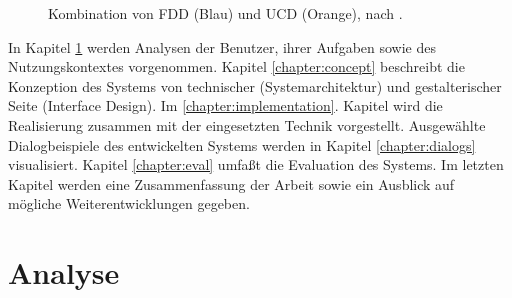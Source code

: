 \documentclass[12pt,        %
  english,ngerman,          %
  paper=a4,                 %
  captions=tablesignature,  %
  listof=numbered,          %
  bibliography=totoc,       %
  headings=small,           %
  headinclude=false,        %
  footinclude=false,        %
  parskip=half-,            %
  oneside,                  %
  BCOR=5mm,                 %
  DIV=12                    %
  ]{scrbook}                %
\begin{document}
\begin{figure}[htbp]
\begin{center}
\end{center}
\caption[Kombination von FDD und UCD, nach \protect\cite{roenspiess-2009-teaco}.]%
  {Kombination von FDD (Blau) und UCD (Orange), nach \protect\cite{roenspiess-2009-teaco}.}
\label{fig:fdducd}
\end{figure}


In Kapitel \ref{chapter:analysis} werden Analysen der Benutzer, ihrer Aufgaben sowie des Nutzungskontextes vorgenommen. Kapitel \ref{chapter:concept} beschreibt die Konzeption des Systems von technischer (Systemarchitektur) und gestalterischer Seite (Interface Design). Im \ref{chapter:implementation}. Kapitel wird die Realisierung zusammen mit der eingesetzten Technik vorgestellt. Ausgewählte Dialogbeispiele des entwickelten Systems werden in Kapitel \ref{chapter:dialogs} visualisiert. Kapitel \ref{chapter:eval} umfaßt die Evaluation des Systems. Im letzten Kapitel werden eine Zusammenfassung der Arbeit sowie ein Ausblick auf mögliche Weiterentwicklungen gegeben.

\chapter{Analyse}\label{chapter:analysis}

\end{document}
